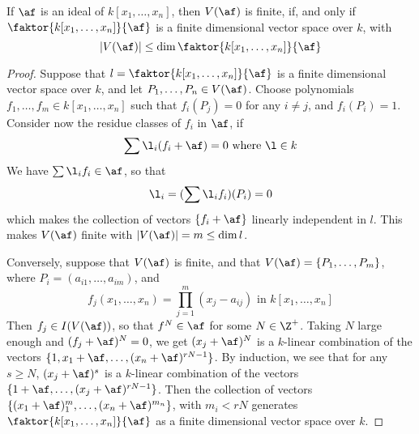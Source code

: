 \begin{corollary}
    If $\af$ is an ideal of  $k[x_1, \dots, x_n]$, then $V(\af)$ is finite, if,
    and only if $\faktor{k[x_1,\dots,x_n]}{\af}$ is a finite dimensional vector
    space over $k$, with
    \begin{equation*}
        |V(\af)| \leq \dim{\faktor{k[x_1,\dots,x_n]}{\af}}
    \end{equation*}
\end{corollary}
\begin{proof}
    Suppose that $l=\faktor{k[x_1,\dots,x_n]}{\af}$ is a finite dimensional
    vector space over $k$, and let  $P_1, \dots, P_n \in V(\af)$. Choose
    polynomials $f_1, \dots, f_m \in k[x_1, \dots, x_n]$ such that $f_i(P_j)=0$
    for any $i \neq j$, and $f_i(P_i)=1$. Consider now the residue classes of
    $f_i$ in $\af$, if
    \begin{equation*}
        \sum{\l_i(f_i+\af)}=0 \text{ where } \l \in k
    \end{equation*}
    We have $\sum{\l_if_i} \in \af$, so that
    \begin{equation*}
        \l_i=(\sum{\l_if_i})(P_i)=0
    \end{equation*}
    which makes the collection of vectors $\{f_i+\af\}$ linearly independent in
    $l$. This makes $V(\af)$ finite with $|V(\af)|=m \leq \dim{l}$.

    Conversely, suppose that $V(\af)$ is finite, and that $V(\af)=\{P_1, \dots,
    P_m\}$, where $P_i=(a_{i1}, \dots, a_{im})$, and
    \begin{equation*}
        f_j(x_1, \dots, x_n)=\prod_{j=1}^m{(x_j-a_{ij})} \text{ in } k[x_1,
        \dots, x_n]
    \end{equation*}
    Then $f_j \in I(V(\af))$, so that $f^N \in \af$ for some $N \in \Z^+$. Taking
    $N$ large enough and $(f_j+\af)^N=0$, we get $(x_j+\af)^N$ is a $k$-linear
    combination of the vectors $\{1, x_1+\af, \dots, (x_n+\af)^{rN-1}\}$. By
    induction, we see that for any $s \geq N$, $(x_j+\af)^s$ is a $k$-linear
    combination of the vectors $\{1+\af, \dots, (x_j+\af)^{rN-1}\}$. Then the
    collection of vectors $\{(x_1+\af)^m_1, \dots, (x_n+\af)^{m_n}\}$, with
    $m_i<rN$ generates $\faktor{k[x_1,\dots,x_n]}{\af}$ as a finite dimensional
    vector space over $k$.
\end{proof}

